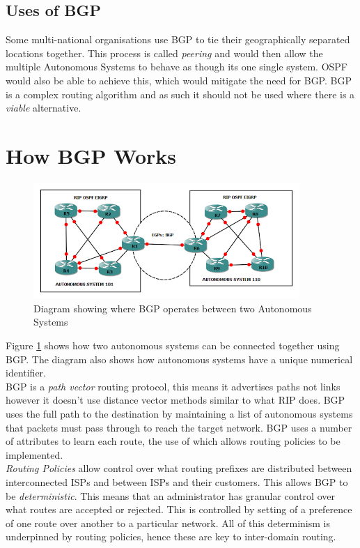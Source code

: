 \subsection{Uses of BGP}
Some multi-national organisations use BGP to tie their geographically separated locations together. This process is called \textit{peering} and would then allow the multiple Autonomous Systems to behave as though its one single system. OSPF would also be able to achieve this, which would mitigate the need for BGP. BGP is a complex routing algorithm and as such it should not be used where there is a \textit{viable} alternative. 

\section{How BGP Works}
\begin{figure}[ht]
    \centering
    \includegraphics[width=0.9\textwidth]{assets/bgp-implementation.png}
    \caption{Diagram showing where BGP operates between two Autonomous Systems}
    \label{fig:bgp-implementation}
\end{figure}

Figure \ref{fig:bgp-implementation} shows how two autonomous systems can be connected together using BGP. The diagram also shows how autonomous systems have a unique numerical identifier.\\

BGP is a \textit{path vector} routing protocol, this means it advertises paths not links however it doesn't use distance vector methods similar to what RIP does. BGP uses the full path to the destination by maintaining a list of autonomous systems that packets must pass through to reach the target network. BGP uses a number of attributes to learn each route, the use of which allows routing policies to be implemented.\\ 

\textit{Routing Policies} allow control over what routing prefixes are distributed between interconnected ISPs and between ISPs and their customers. This allows BGP to be \textit{deterministic}. This means that an administrator has granular control over what routes are accepted or rejected. This is controlled by setting of a preference of one route over another to a particular network. All of this determinism is underpinned by routing policies, hence these are key to inter-domain routing.\\

